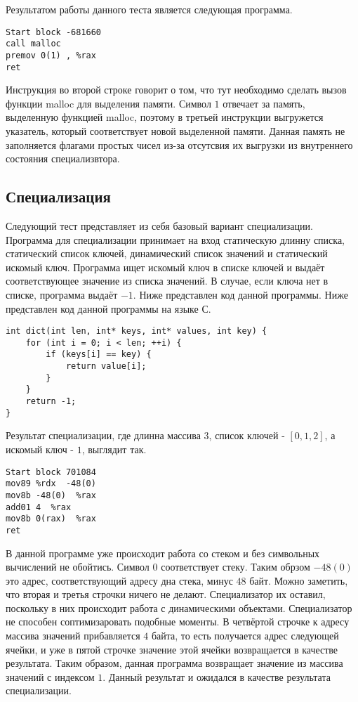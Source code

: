 \documentclass{spbau-diploma}
\begin{document}
Результатом работы данного теста является следующая программа.
\begin{lstlisting}
Start block -681660
call malloc
premov 0(1) , %rax 
ret
\end{lstlisting}
Инструкция во второй строке говорит о том, что тут необходимо сделать вызов функции malloc для выделения памяти. Символ $1$ отвечает за память, выделенную функцией malloc, поэтому в третьей инструкции выгружется указатель, который соответствует новой выделенной памяти. Данная память не заполняется флагами простых чисел из-за отсутсвия их выгрузки из внутреннего состояния специализвтора.

\subsection{ Специализация}
Следующий тест представляет из себя базовый вариант специализации. Программа для специализации принимает на вход статическую длинну списка, статический список ключей, динамический список значений и статический искомый ключ. Программа ищет искомый ключ в списке ключей и выдаёт соответствующее значение из списка значений. В случае, если ключа нет в списке, программа выдаёт $-1$. Ниже представлен код данной программы. Ниже представлен код данной программы на языке С.
\begin{lstlisting}
int dict(int len, int* keys, int* values, int key) {
    for (int i = 0; i < len; ++i) {
        if (keys[i] == key) {
            return value[i];
        }
    }
    return -1;
}
\end{lstlisting}
Результат специализации, где длинна массива $3$, список ключей - $[0, 1, 2]$, а искомый ключ - $1$, выглядит так.
\begin{lstlisting}
Start block 701084
mov89 %rdx  -48(0) 
mov8b -48(0)  %rax 
add01 4  %rax 
mov8b 0(rax)  %rax 
ret
\end{lstlisting}
В данной программе уже происходит работа со стеком и без символьных вычислений не обойтись. Символ $0$ соответствует стеку. Таким обрзом $-48(0)$ это адрес, соответствующий адресу дна стека, минус $48$ байт. Можно заметить, что вторая и третья строчки ничего не делают. Специализатор их оставил, поскольку в них происходит работа с динамическими объектами. Специализатор не способен соптимизаровать подобные моменты. В четвёртой строчке к адресу массива значений прибавляется $4$ байта, то есть получается адрес следующей ячейки, и уже в пятой строчке значение этой ячейки возвращается в качестве результата. Таким образом, данная программа возвращает значение из массива значений с индексом $1$. Данный результат и ожидался в качестве результата специализации.
\end{document}
